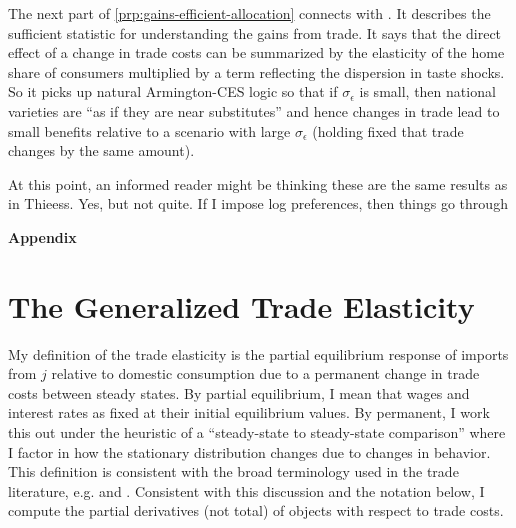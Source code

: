 \documentclass[12pt,pdftex]{article}
\begin{document}
\begin{onehalfspacing}
The next part of \ref{prp:gains-efficient-allocation} connects with \citet{arkolakis2012new}. It describes the sufficient statistic for understanding the gains from trade. It says that the direct effect of a change in trade costs can be summarized by the elasticity of the home share of consumers multiplied by a term reflecting the dispersion in taste shocks. So it picks up natural Armington-CES logic so that if $\sigma_{\epsilon}$ is small, then national varieties are ``as if they are near substitutes'' and hence changes in trade lead to small benefits relative to a scenario with large $\sigma_{\epsilon}$ (holding fixed that trade changes by the same amount).

At this point, an informed reader might be thinking these are the same results as in Thieess. Yes, but not quite. If I impose log preferences, then things go through




\newpage




\appendix

\clearpage
\newpage

\begin{center}
\textbf{\Large Appendix}
\end{center}





\section{The Generalized Trade Elasticity}

My definition of the trade elasticity is the partial equilibrium response of imports from $j$ relative to domestic consumption due to a permanent change in trade costs between steady states. By partial equilibrium, I mean that wages and interest rates as fixed at their initial equilibrium values. By permanent, I work this out under the heuristic of a ``steady-state to steady-state comparison'' where I factor in how the stationary distribution changes due to changes in behavior. This definition is consistent with the broad terminology used in the trade literature, e.g. \citet{arkolakis2012new} and \citet{simonovska2014elasticity}. Consistent with this discussion and the notation below, I compute the partial derivatives (not total) of objects with respect to trade costs.


\end{onehalfspacing}
\end{document}
